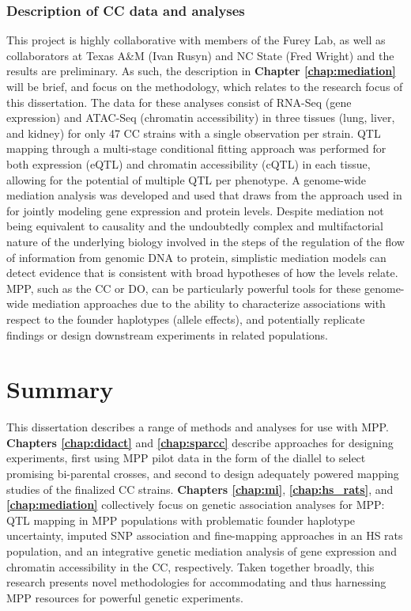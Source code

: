 \subsubsection{Description of CC data and analyses}

This project is highly collaborative with members of the Furey Lab, as well as collaborators at Texas A\&M (Ivan Rusyn) and NC State (Fred Wright) and the results are preliminary. As such, the description in \textbf{Chapter \ref{chap:mediation}} will be brief, and focus on the methodology, which relates to the research focus of this dissertation. The data for these analyses consist of RNA-Seq (gene expression) and ATAC-Seq (chromatin accessibility) in three tissues (lung, liver, and kidney) for only 47 CC strains with a single observation per strain. QTL mapping through a multi-stage conditional fitting approach \citep{Jansen2017} was performed for both expression (eQTL) and chromatin accessibility (cQTL) in each tissue, allowing for the potential of multiple QTL per phenotype. A genome-wide mediation analysis was developed and used that draws from the approach used in \cite{Chick2016} for jointly modeling gene expression and protein levels. Despite mediation not being equivalent to causality and the undoubtedly complex and multifactorial nature of the underlying biology involved in the steps of the regulation of the flow of information from genomic DNA to protein, simplistic mediation models can detect evidence that is consistent with broad hypotheses of how the levels relate. MPP, such as the CC or DO, can be particularly powerful tools for these genome-wide mediation approaches due to the ability to characterize associations with respect to the founder haplotypes (allele effects), and potentially replicate findings or design downstream experiments in related populations.

\section{Summary}

This dissertation describes a range of methods and analyses for use with MPP. \textbf{Chapters \ref{chap:didact}} and \textbf{\ref{chap:sparcc}} describe approaches for designing experiments, first using MPP pilot data in the form of the diallel to select promising bi-parental crosses, and second to design adequately powered mapping studies of the finalized CC strains. \textbf{Chapters \ref{chap:mi}}, \textbf{\ref{chap:hs_rats}}, and \textbf{\ref{chap:mediation}} collectively focus on genetic association analyses for MPP: QTL mapping in MPP populations with problematic founder haplotype uncertainty, imputed SNP association and fine-mapping approaches in an HS rats population, and an integrative genetic mediation analysis of gene expression and chromatin accessibility in the CC, respectively. Taken together broadly, this research presents novel methodologies for accommodating and thus harnessing MPP resources for powerful genetic experiments.



